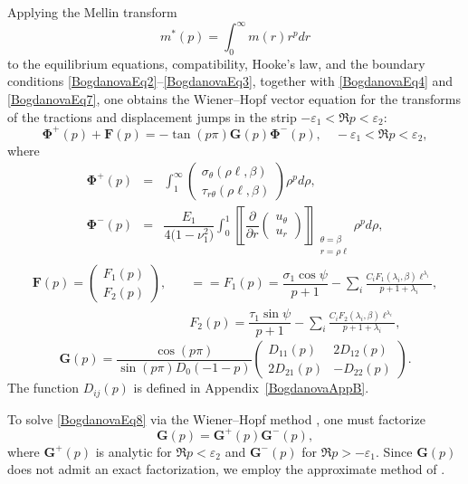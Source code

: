 Applying the Mellin transform
\[
m^*(p)=\int_{0}^{\infty}m(r)r^{p}dr
\]
to the equilibrium equations, compatibility, Hooke’s law, and the boundary conditions \eqref{BogdanovaEq2}–\eqref{BogdanovaEq3}, together with \eqref{BogdanovaEq4} and \eqref{BogdanovaEq7}, one obtains the Wiener–Hopf vector equation for the transforms of the tractions and displacement jumps in the strip $-\varepsilon_1<\Re p<\varepsilon_2$:
\begin{equation}
	\boldsymbol{\Phi}^{+}(p)+\mathbf{F}(p)
	=-\tan(p\pi)\mathbf{G}(p)\boldsymbol{\Phi}^{-}(p),
	\quad-\varepsilon_{1}<\Re p<\varepsilon_{2},
	\label{BogdanovaEq8}
\end{equation}
where
\[
\begin{array}{rcl}
	\boldsymbol{\Phi}^{+}(p)
&=&\displaystyle\int_{1}^{\infty}
\begin{pmatrix}
	\sigma_{\theta}(\rho\ell,\beta)\\
	\tau_{r\theta}(\rho\ell,\beta)
\end{pmatrix}
\rho^{p} d\rho,
\\
\boldsymbol{\Phi}^{-}(p) &=&\dfrac{E_{1}}{4\big(1-\nu_{1}^{2}\big)}
\displaystyle\int_{0}^{1}
\left\llbracket
\dfrac{\partial}{\partial r}
\begin{pmatrix}
	u_{\theta}\\
	u_{r}
\end{pmatrix}
\right\rrbracket_{\substack{\theta=\beta\\r=\rho\ell}}
\rho^{p}d\rho,
\end{array}
\]
\[
\begin{array}{ll}
	\mathbf{F}(p)
=\begin{pmatrix}
	F_{1}(p)\\
	F_{2}(p)
\end{pmatrix}, & \quad==
F_{1}(p)
=\dfrac{\sigma_{1}\cos\psi}{p+1}
-\displaystyle\sum_{i}\frac{C_{i} F_{1}(\lambda_{i},\beta) \ell^{\lambda_{i}}}
{p+1+\lambda_{i}},
\\
& \quad F_{2}(p)
=\dfrac{\tau_{1}\sin\psi}{p+1}
-\displaystyle\sum_{i}\frac{C_{i} F_{2}(\lambda_{i},\beta) \ell^{\lambda_{i}}}
{p+1+\lambda_{i}},
\end{array}
\]
\[
\mathbf{G}(p)
=\frac{\cos(p\pi)}{\sin(p\pi)D_{0}(-1-p)}
\begin{pmatrix}
	D_{11}(p) & 2D_{12}(p)
	\\
	2D_{21}(p) & -D_{22}(p)
\end{pmatrix}.
\]
The function  $D_{ij}(p)$ is defined in Appendix~\ref{BogdanovaAppB}.

To solve \eqref{BogdanovaEq8} via the Wiener–Hopf method \cite{Bogdanova32}, one must factorize
\[
\mathbf{G}(p)=\mathbf{G}^{+}(p) \mathbf{G}^{-}(p),
\]
where $\mathbf{G}^{+}(p)$ is analytic for $\Re p<\varepsilon_{2}$ and $\mathbf{G}^{-}(p)$ for $\Re p>-\varepsilon_{1}$.  Since $\mathbf{G}(p)$ does not admit an exact factorization, we employ the approximate method of \cite{Bogdanova26}.

